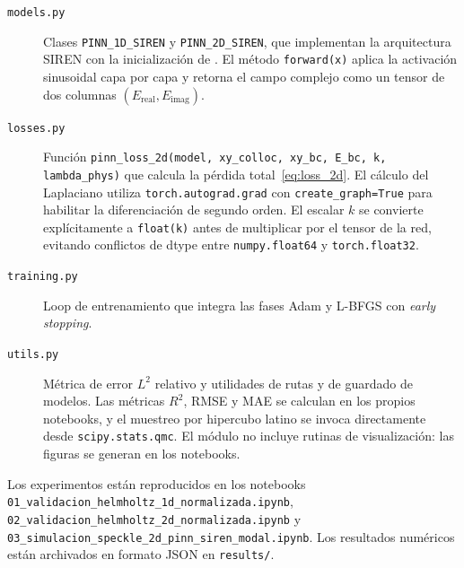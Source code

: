 \begin{description}
    \item[\texttt{models.py}] Clases \texttt{PINN\_1D\_SIREN} y
    \texttt{PINN\_2D\_SIREN}, que implementan
    la arquitectura SIREN con la inicialización de \textcite{sitzmann2020siren}.
    El método \texttt{forward(x)} aplica la activación sinusoidal capa por capa
    y retorna el campo complejo como un tensor de dos columnas
    $(E_\text{real}, E_\text{imag})$.

    \item[\texttt{losses.py}] Función \texttt{pinn\_loss\_2d(model,
    xy\_colloc, xy\_bc, E\_bc, k, lambda\_phys)} que calcula la pérdida
    total~\eqref{eq:loss_2d}.
    El cálculo del Laplaciano utiliza \texttt{torch.autograd.grad} con
    \texttt{create\_graph=True} para habilitar la diferenciación de segundo orden.
    El escalar $k$ se convierte explícitamente a \texttt{float(k)} antes de
    multiplicar por el tensor de la red, evitando conflictos de dtype entre
    \texttt{numpy.float64} y \texttt{torch.float32}.

    \item[\texttt{training.py}] Loop de entrenamiento que integra las fases
    Adam y L-BFGS con \textit{early stopping}.

    \item[\texttt{utils.py}] Métrica de error $L^2$ relativo y utilidades de
    rutas y de guardado de modelos. Las métricas $R^2$, RMSE y MAE se
    calculan en los propios notebooks, y el muestreo por hipercubo latino se
    invoca directamente desde \texttt{scipy.stats.qmc}. El módulo no incluye
    rutinas de visualización: las figuras se generan en los notebooks.
\end{description}

Los experimentos están reproducidos en los notebooks
\texttt{01\_validacion\_helmholtz\_1d\_normalizada.ipynb},
\texttt{02\_validacion\_helmholtz\_2d\_normalizada.ipynb} y
\texttt{03\_simulacion\_speckle\_2d\_pinn\_siren\_modal.ipynb}.
Los resultados numéricos están archivados en formato JSON en \texttt{results/}.
